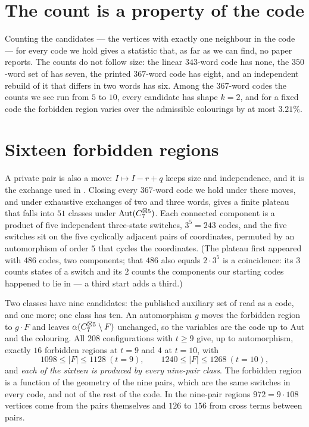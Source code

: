 \section{The count is a property of the code}
\label{sec:count}

Counting the candidates --- the vertices with exactly one neighbour in the code --- for every
code we hold gives a statistic that, as far as we can find, no paper reports. The counts do not
follow size: the linear $343$-word code \cite{baumert1971} has none, the $350$-word set of
\cite{mathew2017} has seven, the printed $367$-word code has eight, and an independent rebuild
of it that differs in two words has six. Among the $367$-word codes the counts we see run from
$5$ to $10$, every candidate has shape $k=2$, and for a fixed code the forbidden region varies
over the admissible colourings by at most $3.21\%$.

\section{Sixteen forbidden regions}
\label{sec:regions}

A private pair is also a move: $I\mapsto I-r+q$ keeps size and independence, and it is the
exchange used in \cite{tandon2026}. Closing every $367$-word code we hold under these moves,
and under exhaustive exchanges of two and three words, gives a finite plateau that falls into
$51$ classes under $\mathrm{Aut}(C_7^{\boxtimes 5})$. Each connected component is a product of
five independent three-state switches, $3^5=243$ codes, and the five switches sit on the five
cyclically adjacent pairs of coordinates, permuted by an automorphism of order $5$ that cycles
the coordinates. (The plateau first appeared with $486$ codes, two components; that $486$ also
equals $2\cdot3^5$ is a coincidence: its $3$ counts states of a switch and its $2$ counts the
components our starting codes happened to lie in --- a third start adds a third.)

Two classes have nine candidates: the published auxiliary set of \cite{gao2026} read as a code,
and one more; one class has ten. An automorphism $g$ moves the forbidden region to $g\cdot F$
and leaves $\alpha(C_7^{\boxtimes5}\setminus F)$ unchanged, so the variables are the code up to
$\mathrm{Aut}$ and the colouring. All $208$ configurations with $t\ge9$ give, up to
automorphism, exactly $16$ forbidden regions at $t=9$ and $4$ at $t=10$, with
\[
  1098\le|F|\le1128\ (t=9),\qquad 1240\le|F|\le1268\ (t=10),
\]
and \emph{each of the sixteen is produced by every nine-pair class}. The forbidden region is a
function of the geometry of the nine pairs, which are the same switches in every code, and not
of the rest of the code. In the nine-pair regions $972=9\cdot108$ vertices come from the pairs
themselves and $126$ to $156$ from cross terms between pairs.

